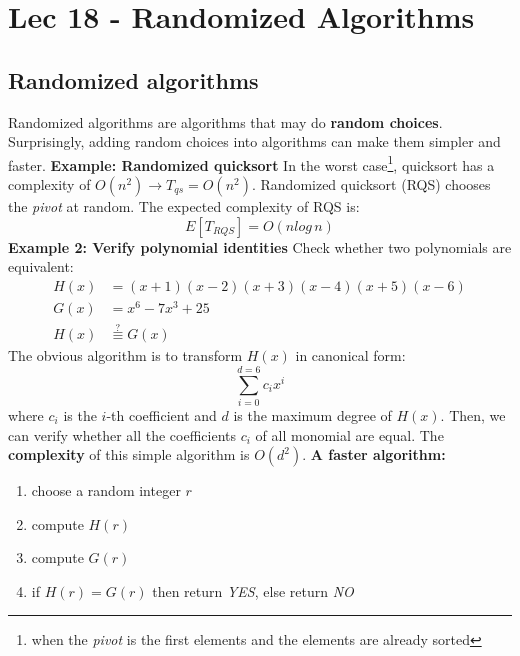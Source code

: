 \chapter{Lec 18 - Randomized Algorithms}

\section{Randomized algorithms}
Randomized algorithms are algorithms that may do \textbf{random choices}. Surprisingly, adding random choices into algorithms can make them simpler and faster.\newline\newline
\textbf{Example: Randomized quicksort}\newline\newline
In the worst case\footnote{when the \textit{pivot} is the first elements and the elements are already sorted}, quicksort has a complexity of $O(n^2) \rightarrow T_{qs} = O(n^2)$.\newline\newline
Randomized quicksort (RQS) chooses the \textit{pivot} at random. The expected complexity of RQS is:
\[E[T_{RQS}] = O(nlog\,n)\]
\textbf{Example 2: Verify polynomial identities}
Check whether two polynomials are equivalent:
\begin{equation}
    \begin{split}
        H(x) & = (x + 1)(x - 2)(x + 3)(x - 4)(x + 5)(x - 6)\\
        G(x) & = x^6 -7x^3 + 25 \\
        H(x) & \stackrel{?}{\equiv} G(x)
    \end{split}
\end{equation}
The obvious algorithm is to transform $H(x)$ in canonical form:
\[\sum_{i=0}^{d = 6}c_ix^i\]
where $c_i$ is the $i$-th coefficient and $d$ is the maximum degree of $H(x)$. Then, we can verify whether all the coefficients $c_i$ of all monomial are equal.\newline\newline
The \textbf{complexity} of this simple algorithm is $O(d^2)$.\newline\newline
\textbf{A faster algorithm:}
\begin{enumerate}
    \item choose a random integer $r$
    \item compute $H(r)$
    \item compute $G(r)$
    \item if $H(r) = G(r)$ then return \textit{YES}, else return \textit{NO}
\end{enumerate}
